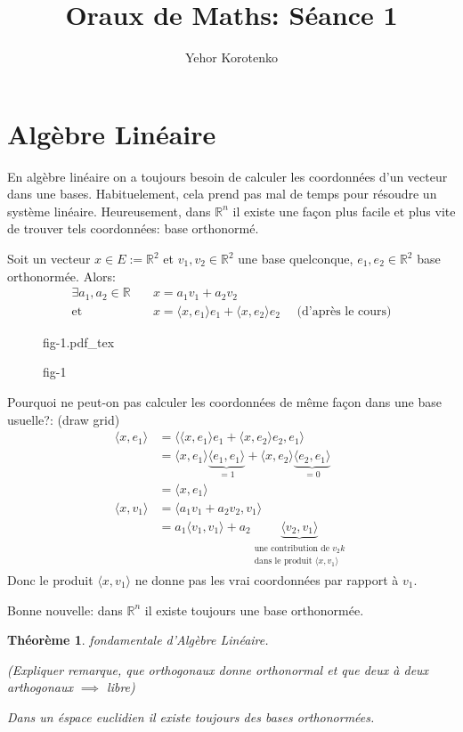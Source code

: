 \documentclass[a4paper]{article}
\author{Yehor Korotenko}
\title{Oraux de Maths: Séance 1}
\newcommand{\R}{\mathbb{R}}
\newtheorem{theoreme}{Théorème}[section]
\newcommand{\scalair}[1]{\langle #1 \rangle}
\newcommand{\incfig}[1]{%
    \def\svgwidth{\columnwidth}
    {#1.pdf_tex}
}
\begin{document}
   \maketitle 
   \section{Algèbre Linéaire}
   En algèbre linéaire on a toujours besoin de calculer les coordonnées d'un vecteur dans une bases. Habituelement, cela prend pas mal de temps pour résoudre un système linéaire. 
   Heureusement, dans $\R^n$ il existe une façon plus facile et plus vite de trouver tels coordonnées: base orthonormé. 
    \par
        Soit un vecteur  $x \in E := \R^2$ et  $v_1, v_2 \in \R^2$ une base quelconque, $e_1, e_2 \in \R^2$ base orthonormée. Alors:
        \begin{align*}
            \exists a_1, a_2 \in \R \quad &x = a_1v_1 + a_2v_2\\
            \text{et }                    &x = \scalair{x, e_1}e_1 + \scalair{x, e_2}e_2 \quad \text{ (d'après le cours)}
        \end{align*}
\begin{figure}[H]
    \centering
    \incfig{fig-1}
    \caption{fig-1}
    \label{fig:fig-1}
\end{figure}
Pourquoi ne peut-on pas calculer les coordonnées de même façon dans une base usuelle?: (draw grid)
\begin{align*}
    \scalair{x, e_1} &= \scalair{\scalair{x, e_1}e_1 + \scalair{x, e_2}e_2, e_1}\\
                     &= \scalair{x, e_1}\underbrace{ \scalair{e_1,e_1} }_{= 1} + \scalair{x, e_2}\underbrace{\scalair{e_2, e_1}}_{= 0}\\
                     &= \scalair{x, e_1}\\
    \scalair{x, v_1} &= \scalair{a_1v_1 + a_2v_2, v_1}\\
                     &= a_1\scalair{v_1, v_1} + a_2\underbrace{ \scalair{v_2, v_1} }_{\substack{\text{une contribution de $v_2k$}\\\text{dans le produit $\scalair{x, v_1}$}}}
\end{align*}
Donc le produit $\scalair{x, v_1}$ ne donne pas les vrai coordonnées par rapport à $v_1$.
\par
Bonne nouvelle: dans $\R^n$ il existe toujours une base orthonormée.
\begin{theoreme}\label{thm:thm-fond}
   fondamentale d'Algèbre Linéaire. \par
   (Expliquer remarque, que orthogonaux donne orthonormal et que deux à deux arthogonaux $\implies$ libre)\par
   Dans un éspace euclidien il existe toujours des bases orthonormées.
\end{theoreme}
\end{document}
